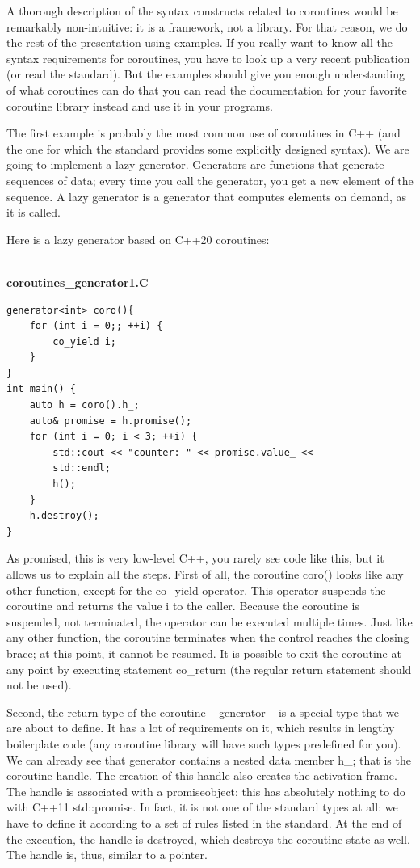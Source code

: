 A thorough description of the syntax constructs related to coroutines would be 
remarkably non-intuitive: it is a framework, not a library. For that reason, we do the rest of the presentation using examples. If you really want to know all the syntax requirements for coroutines, you have to look up a very recent publication (or read the standard). But the examples should give you enough understanding of what coroutines can do that you can read the documentation for your favorite coroutine library instead and use it in your  programs.


The first example is probably the most common use of coroutines in C++ (and the one for which the standard provides some explicitly designed syntax). We are going to implement a lazy generator. Generators are functions that generate sequences of data; every time you call the generator, you get a new element of the sequence. A lazy generator is a generator that computes elements on demand, as it is called. 

Here is a lazy generator based on C++20 coroutines:

\hspace*{\fill} \\ %
\noindent
\textbf{coroutines\_generator1.C}
\begin{lstlisting}[style=styleCXX]
generator<int> coro(){
	for (int i = 0;; ++i) {
		co_yield i;
	}
}
int main() {
	auto h = coro().h_;
	auto& promise = h.promise();
	for (int i = 0; i < 3; ++i) {
		std::cout << "counter: " << promise.value_ << 
		std::endl;
		h();
	}
	h.destroy();
}
\end{lstlisting}

As promised, this is very low-level C++, you rarely see code like this, but it allows us to explain all the steps. First of all, the coroutine coro() looks like any other function, except for the co\_yield operator. This operator suspends the coroutine and returns the value i to the caller. Because the coroutine is suspended, not terminated, the operator can be executed multiple times. Just like any other function, the coroutine terminates when the control reaches the closing brace; at this point, it cannot be resumed. It is possible to exit the coroutine at any point by executing statement co\_return (the regular return statement should not be used).

Second, the return type of the coroutine – generator – is a special type that we are about to define. It has a lot of requirements on it, which results in lengthy boilerplate code (any coroutine library will have such types predefined for you). We can already see that generator contains a nested data member h\_; that is the coroutine handle. The creation of this handle also creates the activation frame. The handle is associated with a promiseobject; this has absolutely nothing to do with C++11 std::promise. In fact, it is not one of the standard types at all: we have to define it according to a set of rules listed in the standard. At the end of the execution, the handle is destroyed, which destroys the coroutine state as well. The handle is, thus, similar to a pointer.

